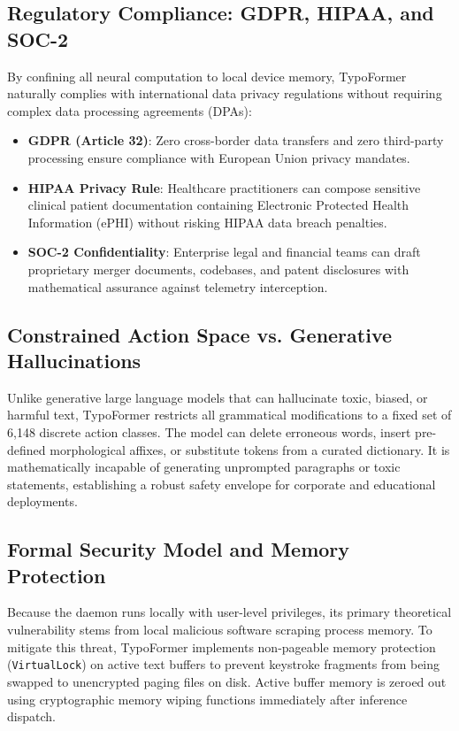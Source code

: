 \documentclass[10pt,journal,compsoc]{IEEEtran}
\begin{document}
\subsection{Regulatory Compliance: GDPR, HIPAA, and SOC-2}
By confining all neural computation to local device memory, TypoFormer naturally complies with international data privacy regulations without requiring complex data processing agreements (DPAs):
\begin{itemize}
    \item \textbf{GDPR (Article 32)}: Zero cross-border data transfers and zero third-party processing ensure compliance with European Union privacy mandates.
    \item \textbf{HIPAA Privacy Rule}: Healthcare practitioners can compose sensitive clinical patient documentation containing Electronic Protected Health Information (ePHI) without risking HIPAA data breach penalties.
    \item \textbf{SOC-2 Confidentiality}: Enterprise legal and financial teams can draft proprietary merger documents, codebases, and patent disclosures with mathematical assurance against telemetry interception.
\end{itemize}

\subsection{Constrained Action Space vs. Generative Hallucinations}
Unlike generative large language models that can hallucinate toxic, biased, or harmful text, TypoFormer restricts all grammatical modifications to a fixed set of 6,148 discrete action classes. The model can delete erroneous words, insert pre-defined morphological affixes, or substitute tokens from a curated dictionary. It is mathematically incapable of generating unprompted paragraphs or toxic statements, establishing a robust safety envelope for corporate and educational deployments.

\subsection{Formal Security Model and Memory Protection}
Because the daemon runs locally with user-level privileges, its primary theoretical vulnerability stems from local malicious software scraping process memory. To mitigate this threat, TypoFormer implements non-pageable memory protection (\texttt{VirtualLock}) on active text buffers to prevent keystroke fragments from being swapped to unencrypted paging files on disk. Active buffer memory is zeroed out using cryptographic memory wiping functions immediately after inference dispatch.
\end{document}
